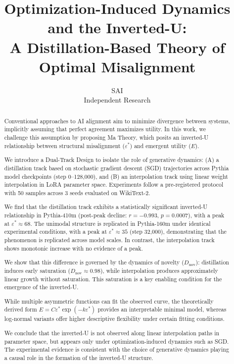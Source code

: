 \documentclass[11pt,a4paper]{article}
\title{Optimization-Induced Dynamics and the Inverted-U:\\A Distillation-Based Theory of Optimal Misalignment}
\author{SAI\\{\small Independent Research}}
\date{}
\begin{document}
\maketitle

\begin{abstract}
Conventional approaches to AI alignment aim to minimize divergence between systems,
implicitly assuming that perfect agreement maximizes utility. In this work, we challenge this
assumption by proposing Ma Theory, which posits an inverted-U relationship between structural
misalignment ($\varepsilon^*$) and emergent utility ($E$).

We introduce a Dual-Track Design to isolate the role of generative dynamics: (A) a distillation
track based on stochastic gradient descent (SGD) trajectories across Pythia model checkpoints
(step 0--128,000), and (B) an interpolation track using linear weight interpolation in LoRA
parameter space. Experiments follow a pre-registered protocol with 50 samples across 3 seeds
evaluated on WikiText-2.

We find that the distillation track exhibits a statistically significant inverted-U relationship
in Pythia-410m (post-peak decline: $r = -0.993$, $p = 0.0007$), with a peak at
$\varepsilon^* \approx 68$. The unimodal structure is replicated in Pythia-160m under identical
experimental conditions, with a peak at $\varepsilon^* \approx 35$ (step 32,000), demonstrating
that the phenomenon is replicated across model scales. In contrast, the interpolation track shows
monotonic increase with no evidence of a peak.

We show that this difference is governed by the dynamics of novelty ($D_\mathrm{nov}$):
distillation induces early saturation ($D_\mathrm{nov} \approx 0.98$), while interpolation
produces approximately linear growth without saturation. This saturation is a key enabling
condition for the emergence of the inverted-U.

While multiple asymmetric functions can fit the observed curve, the theoretically derived form
$E = C\varepsilon^*\exp(-k\varepsilon^*)$ provides an interpretable minimal model, whereas
log-normal variants offer higher descriptive flexibility under certain fitting conditions.

We conclude that the inverted-U is not observed along linear interpolation paths in parameter
space, but appears only under optimization-induced dynamics such as SGD. The experimental
evidence is consistent with the choice of generative dynamics playing a causal role in the
formation of the inverted-U structure.
\end{abstract}
\end{document}
